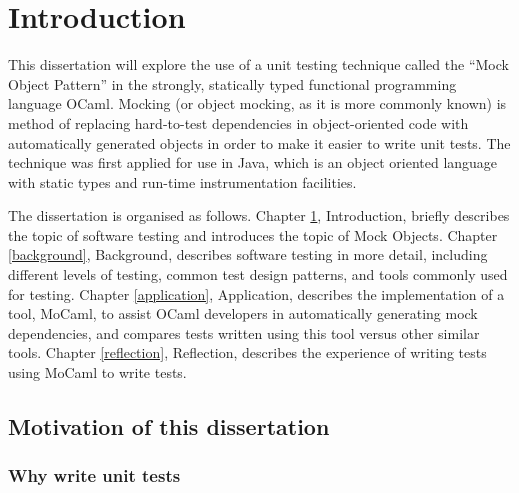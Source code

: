 \chapter{Introduction}
\label{introduction}


This dissertation will explore the use of a unit testing technique
called the ``Mock Object Pattern'' in the strongly, statically typed
functional programming language OCaml. Mocking (or object mocking, as
it is more commonly known) is method of replacing hard-to-test
dependencies in object-oriented code with automatically generated
objects in order to make it easier to write unit tests. The technique
was first applied for use in Java, which is an object oriented
language with static types and run-time instrumentation facilities.


The dissertation is organised as follows. Chapter \ref{introduction},
Introduction, briefly describes the topic of software testing and
introduces the topic of Mock Objects. Chapter \ref{background},
Background, describes software testing in more detail, including
different levels of testing, common test design patterns, and tools
commonly used for testing. Chapter \ref{application}, Application,
describes the implementation of a tool, MoCaml, to assist OCaml
developers in automatically generating mock dependencies, and compares
tests written using this tool versus other similar tools. Chapter
\ref{reflection}, Reflection, describes the experience of writing
tests using MoCaml to write tests.

\section{Motivation of this dissertation}



\subsection{Why write unit tests}

